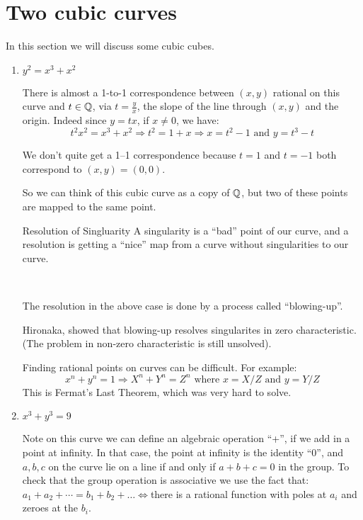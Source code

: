 \section{Two cubic curves}
In this section we will discuss some cubic cubes.\begin{enumerate}
    \item $y^2 = x^3+x^2$
    
There is almost a 1-to-1 correspondence between $(x,y)$ rational on this curve and $t\in \mathbb{Q}$, via $t = \frac{y}{x}$, the slope of the line through $(x,y)$ and the origin. 
Indeed since $y=tx$, if $x\neq 0$, we have:\begin{equation}
    t^2x^2 = x^3+x^2 \Rightarrow t^2 = 1+x \Rightarrow x=t^2-1 \text{ and } y=t^3-t 
\end{equation}

We don't quite get a 1--1 correspondence because $t=1$ and $t=-1$ both correspond to $(x,y) = (0,0)$. 

So we can think of this cubic curve as a copy of $\mathbb{Q}$, but two of these points are mapped to the same point.

\begin{definition}
    Resolution of Singluarity
    A singularity is a ``bad'' point of our curve, and a resolution is getting a ``nice'' map from a curve without singularities to our curve.    
\end{definition} 

\

The resolution in the above case is done by a process called ``blowing-up''.
\begin{remark}
    Hironaka, showed that blowing-up resolves singularites in zero characteristic. (The problem in non-zero characteristic is still unsolved).
\end{remark}
\begin{remark}
    Finding rational points on curves can be difficult. For example:\begin{equation}
        x^n + y^n = 1 \Rightarrow X^n+Y^n=Z^n \text{ where }x=X/Z \text{ and }y=Y/Z
    \end{equation}
    This is Fermat's Last Theorem, which was very hard to solve.        
\end{remark}

\item $x^3+y^3 = 9$

Note on this curve we can define an algebraic operation ``+'', if we add in a point at infinity.
In that case, the point at infinity is the identity ``0'', and $a,b,c$ on the curve lie on a line if and only if $a+b+c = 0$ in the group. To check that the group operation is associative we use the fact that: $a_1+a_2+\cdots = b_1+b_2+\dots \iff $there is a rational function with poles at $a_i$ and zeroes at the $b_i$.


\end{enumerate}
